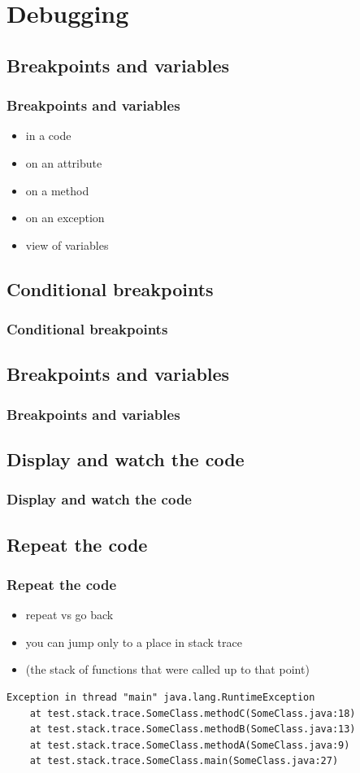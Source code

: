 \documentclass{beamer}
\begin{document}
\section{Debugging}

\subsection{Breakpoints and variables}
\begin{frame}[fragile]
\frametitle{Breakpoints and variables}
\begin{itemize}
\item in a code
\item on an attribute
\item on a method
\item on an exception
\item view of variables
\end{itemize}
\end{frame}

\subsection{Conditional breakpoints}
\begin{frame}[fragile]
\frametitle{Conditional breakpoints}
\end{frame}

\subsection{Breakpoints and variables}
\begin{frame}[fragile]
\frametitle{Breakpoints and variables}
\end{frame}

\subsection{Display and watch the code}
\begin{frame}[fragile]
\frametitle{Display and watch the code}
\end{frame}

\subsection{Repeat the code}
\begin{frame}[fragile]
\frametitle{Repeat the code}
\begin{itemize}
\item repeat vs go back
\item you can jump only to a place in stack trace
\item (the stack of functions that were called up to that point)
\end{itemize}
\begin{lstlisting}
Exception in thread "main" java.lang.RuntimeException
    at test.stack.trace.SomeClass.methodC(SomeClass.java:18)
    at test.stack.trace.SomeClass.methodB(SomeClass.java:13)
    at test.stack.trace.SomeClass.methodA(SomeClass.java:9)
    at test.stack.trace.SomeClass.main(SomeClass.java:27)
\end{lstlisting}
\end{frame}
\end{document}
